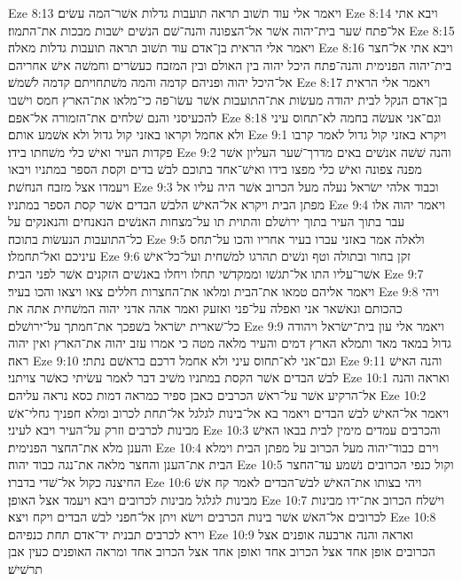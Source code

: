 Eze 8:13  ויאמר אלי עוד תשׁוב תראה תועבות גדלות אשׁר־המה עשׂים׃
Eze 8:14  ויבא אתי אל־פתח שׁער בית־יהוה אשׁר אל־הצפונה והנה־שׁם הנשׁים ישׁבות מבכות את־התמוז׃
Eze 8:15  ויאמר אלי הראית בן־אדם עוד תשׁוב תראה תועבות גדלות מאלה׃
Eze 8:16  ויבא אתי אל־חצר בית־יהוה הפנימית והנה־פתח היכל יהוה בין האולם ובין המזבח כעשׂרים וחמשׁה אישׁ אחריהם אל־היכל יהוה ופניהם קדמה והמה משׁתחויתם קדמה לשׁמשׁ׃
Eze 8:17  ויאמר אלי הראית בן־אדם הנקל לבית יהודה מעשׂות את־התועבות אשׁר עשׂו־פה כי־מלאו את־הארץ חמס וישׁבו להכעיסני והנם שׁלחים את־הזמורה אל־אפם׃
Eze 8:18  וגם־אני אעשׂה בחמה לא־תחוס עיני ולא אחמל וקראו באזני קול גדול ולא אשׁמע אותם׃
Eze 9:1  ויקרא באזני קול גדול לאמר קרבו פקדות העיר ואישׁ כלי משׁחתו בידו׃
Eze 9:2  והנה שׁשׁה אנשׁים באים מדרך־שׁער העליון אשׁר מפנה צפונה ואישׁ כלי מפצו בידו ואישׁ־אחד בתוכם לבשׁ בדים וקסת הספר במתניו ויבאו ויעמדו אצל מזבח הנחשׁת׃
Eze 9:3  וכבוד אלהי ישׂראל נעלה מעל הכרוב אשׁר היה עליו אל מפתן הבית ויקרא אל־האישׁ הלבשׁ הבדים אשׁר קסת הספר במתניו׃
Eze 9:4  ויאמר יהוה אלו עבר בתוך העיר בתוך ירושׁלם והתוית תו על־מצחות האנשׁים הנאנחים והנאנקים על כל־התועבות הנעשׂות בתוכה׃
Eze 9:5  ולאלה אמר באזני עברו בעיר אחריו והכו על־תחס עיניכם ואל־תחמלו׃
Eze 9:6  זקן בחור ובתולה וטף ונשׁים תהרגו למשׁחית ועל־כל־אישׁ אשׁר־עליו התו אל־תגשׁו וממקדשׁי תחלו ויחלו באנשׁים הזקנים אשׁר לפני הבית׃
Eze 9:7  ויאמר אליהם טמאו את־הבית ומלאו את־החצרות חללים צאו ויצאו והכו בעיר׃
Eze 9:8  ויהי כהכותם ונאשׁאר אני ואפלה על־פני ואזעק ואמר אהה אדני יהוה המשׁחית אתה את כל־שׁארית ישׂראל בשׁפכך את־חמתך על־ירושׁלם׃
Eze 9:9  ויאמר אלי עון בית־ישׂראל ויהודה גדול במאד מאד ותמלא הארץ דמים והעיר מלאה מטה כי אמרו עזב יהוה את־הארץ ואין יהוה ראה׃
Eze 9:10  וגם־אני לא־תחוס עיני ולא אחמל דרכם בראשׁם נתתי׃
Eze 9:11  והנה האישׁ לבשׁ הבדים אשׁר הקסת במתניו משׁיב דבר לאמר עשׂיתי כאשׁר צויתני׃
Eze 10:1  ואראה והנה אל־הרקיע אשׁר על־ראשׁ הכרבים כאבן ספיר כמראה דמות כסא נראה עליהם׃
Eze 10:2  ויאמר אל־האישׁ לבשׁ הבדים ויאמר בא אל־בינות לגלגל אל־תחת לכרוב ומלא חפניך גחלי־אשׁ מבינות לכרבים וזרק על־העיר ויבא לעיני׃
Eze 10:3  והכרבים עמדים מימין לבית בבאו האישׁ והענן מלא את־החצר הפנימית׃
Eze 10:4  וירם כבוד־יהוה מעל הכרוב על מפתן הבית וימלא הבית את־הענן והחצר מלאה את־נגה כבוד יהוה׃
Eze 10:5  וקול כנפי הכרובים נשׁמע עד־החצר החיצנה כקול אל־שׁדי בדברו׃
Eze 10:6  ויהי בצותו את־האישׁ לבשׁ־הבדים לאמר קח אשׁ מבינות לגלגל מבינות לכרובים ויבא ויעמד אצל האופן׃
Eze 10:7  וישׁלח הכרוב את־ידו מבינות לכרובים אל־האשׁ אשׁר בינות הכרבים וישׂא ויתן אל־חפני לבשׁ הבדים ויקח ויצא׃
Eze 10:8  וירא לכרבים תבנית יד־אדם תחת כנפיהם׃
Eze 10:9  ואראה והנה ארבעה אופנים אצל הכרובים אופן אחד אצל הכרוב אחד ואופן אחד אצל הכרוב אחד ומראה האופנים כעין אבן תרשׁישׁ׃
